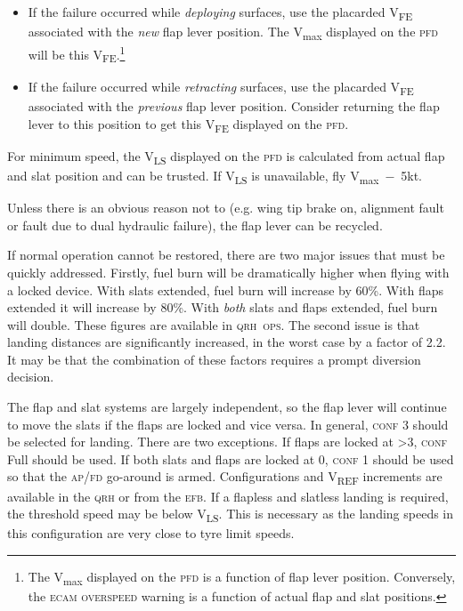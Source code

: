\documentclass[a5paper,11pt,twoside]{book}
\newcommand{\ac}[1]{{\scshape\MakeLowercase{#1}}}
\newcommand{\cphrase}[1]{\ac{#1}}
\newcommand{\V}[1]{V\textsubscript{#1}}
\begin{document}
\begin{itemize}
\item If the failure occurred while \emph{deploying} surfaces, use the placarded
  \V{FE} associated with the \emph{new} flap lever position. The \V{max}
  displayed on the \ac{PFD} will be this \V{FE}.\footnote{The \V{max} displayed
  on the \ac{PFD} is a function of flap lever position. Conversely, the
  \ac{ecam} \ac{overspeed} warning is a function of actual flap and slat
  positions.}
\item If the failure occurred while \emph{retracting} surfaces, use the
  placarded \V{FE} associated with the \emph{previous} flap lever
  position. Consider returning the flap lever to this position to get this
  \V{FE} displayed on the \ac{PFD}.
\end{itemize}

For minimum speed, the \V{LS} displayed on the \ac{PFD} is calculated from
actual flap and slat position and can be trusted. If \V{LS} is unavailable, fly
\V{max}~$-$~5kt.

Unless there is an obvious reason not to (e.g. wing tip brake on, alignment
fault or fault due to dual hydraulic failure), the flap lever can be recycled.

If normal operation cannot be restored, there are two major issues that must be
quickly addressed. Firstly, fuel burn will be dramatically higher when flying
with a locked device. With slats extended, fuel burn will increase by 60\%. With
flaps extended it will increase by 80\%. With \emph{both} slats and flaps
extended, fuel burn will double. These figures are available in
\cphrase{QRH~OPS}. The second issue is that landing distances are significantly
increased, in the worst case by a factor of 2.2. It may be that the combination
of these factors requires a prompt diversion decision.

The flap and slat systems are largely independent, so the flap lever will
continue to move the slats if the flaps are locked and vice versa. In general,
\ac{conf} 3 should be selected for landing. There are two exceptions. If flaps
are locked at >3, \ac{conf} Full should be used. If both slats and flaps are
locked at 0, \ac{conf} 1 should be used so that the \ac{AP/FD} go-around is
armed. Configurations and \V{REF} increments are available in the \ac{QRH} or
from the \ac{EFB}. If a flapless and slatless landing is required, the threshold
speed may be below \V{LS}. This is necessary as the landing speeds in this
configuration are very close to tyre limit speeds.
\end{document}
